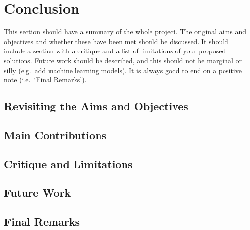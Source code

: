 \chapter{Conclusion}

This section should have a summary of the whole project.
The original aims and objectives and whether these have been met should be discussed.
It should include a section with a critique and a list of limitations of your proposed solutions.
Future work should be described, and this should not be marginal or silly (e.g.\ add machine learning models).
It is always good to end on a positive note (i.e.\ `Final Remarks').

\section{Revisiting the Aims and Objectives}
\blindtext

\section{Main Contributions}
\blindtext

\section{Critique and Limitations}
\blindtext

\section{Future Work}
\blindtext

\section{Final Remarks}
\blindtext
